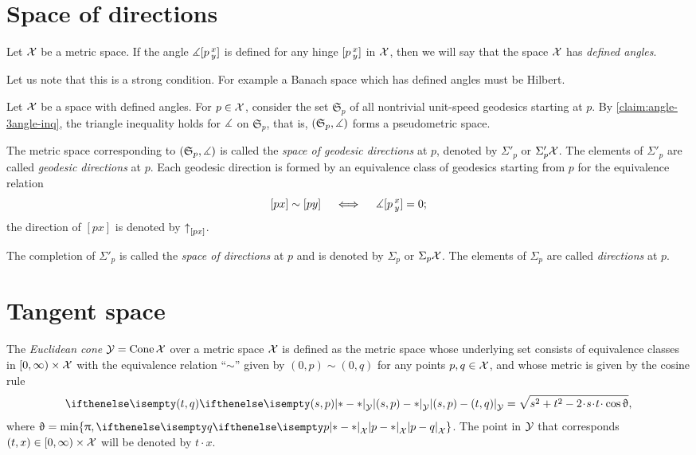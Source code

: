\section{Space of directions} 
\label{sec:tangent-space+directions}

Let $\mathcal{X}$ be a metric space.
If the angle $\measuredangle[p\,{}^{x}_{y}]$ is defined for any hinge $[p\,{}^{x}_{y}]$ in $\mathcal{X}$,
then we will say that the space $\mathcal{X}$ has \emph{defined angles}.

Let us note that this is a strong condition. For example a Banach space which has defined angles must be Hilbert.

 
Let $\mathcal{X}$ be a space with defined angles. For $p\in \spc{X}$,
consider the set $\mathfrak{S}_p$ 
of all nontrivial unit-speed geodesics starting at $p$.
By \ref{claim:angle-3angle-inq}, the triangle inequality holds for $\measuredangle$ on $\mathfrak{S}_p$,
that is, $(\mathfrak{S}_p,\measuredangle)$ 
forms a pseudometric space.

The metric space corresponding to  $(\mathfrak{S}_p,\measuredangle)$ is called the \emph{space of geodesic directions} at $p$, denoted by $\Sigma'_p$ or $\Sigma'_p\mathcal{X}$.
The elements of $\Sigma'_p$ are called \emph{geodesic directions} at $p$.
Each geodesic direction is formed by an equivalence class of geodesics starting from $p$ 
for the equivalence relation 
\[[px]\sim[py]\quad \iff\quad \measuredangle[p\,{}^{x}_{y}]=0;\]
the direction of $[px]$ is denoted by ${\uparrow}_{[{p}{x}]} $.



The completion of $\Sigma'_p$ is called the \emph{space of directions} at $p$ and is denoted by $\Sigma_p$ or $\Sigma_p\mathcal{X}$.
The elements of $\Sigma_p$ are called \emph{directions} at $p$.

\section{Tangent space}\label{sec: tangent space}

The \emph{Euclidean cone} $\mathcal{Y}=\mathop{\rm Cone}\nolimits\mathcal{X}$ 
over a metric space $\mathcal{X}$
is defined as the metric space whose underlying set consists of
equivalence classes in
$[0,\infty)\times \spc{X}$ with the equivalence relation ``$\sim$'' given by $(0,p)\sim (0,q)$ for any points $p,q\in\spc{X}$,
and whose metric is given by the cosine rule
\[
\dist{(s,p)}{(t,q)}{\spc{Y}} 
=
\sqrt{s^2+t^2-2\cdot s\cdot t\cdot \cos\theta},
\]
where $\theta= \min\{\pi, \dist{p}{q}{\spc{X}}\}$.
The point in $\mathcal{Y}$ that corresponds $(t,x)\in[0,\infty)\times \spc{X}$ will be denoted by $t\cdot x$.

